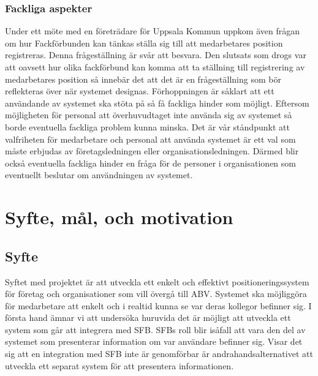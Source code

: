 \documentclass[swedish, a4paper,12pt]{article}
\begin{document}
\subsubsection{Fackliga aspekter}
Under ett möte med en företrädare för Uppsala Kommun uppkom även frågan om hur Fackförbunden kan tänkas ställa sig till att medarbetares position registreras.
Denna frågeställning är svår att besvara. Den slutsats som drogs var att oavsett hur olika fackförbund kan komma att ta ställning till registrering av medarbetares position så innebär det att det är en frågeställning som bör reflekteras över när systemet designas. Förhoppningen är såklart att ett användande av systemet ska stöta på så få fackliga hinder som möjligt. Eftersom möjligheten för personal att överhuvudtaget inte använda sig av systemet så borde eventuella fackliga problem kunna minska. Det är vår ståndpunkt att valfriheten för medarbetare och personal att använda systemet är ett val som måste erbjudas av företagsledningen eller organisationsledningen. Därmed blir också eventuella fackliga hinder en fråga för de personer i organisationen som eventuellt beslutar om användningen av systemet.






\section{Syfte, mål, och motivation}
\subsection{Syfte}
Syftet med projektet är att utveckla ett enkelt och effektivt positioneringssystem för företag och organisationer som vill övergå till ABV. Systemet ska möjliggöra för medarbetare att enkelt och i realtid kunna se var deras kollegor befinner sig. I första hand ämnar vi att undersöka huruvida det är möjligt att utveckla ett system som går att integrera med SFB. SFBs roll blir isåfall att vara den del av systemet som presenterar information om var användare befinner sig. Visar det sig att en integration med SFB inte är genomförbar är andrahandsalternativet att utveckla ett separat system för att presentera informationen.
\end{document}
